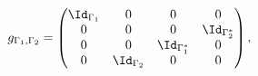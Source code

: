 \begin{equation}
\label{eq:gTdual}
  g_{\Gamma_1,\Gamma_2} =
       \begin{pmatrix}
          \Id_{\Gamma_1} &  0  &  0  &  0 \\
           0  &  0  &  0  & \Id_{\Gamma^*_2}\\     
           0  &  0  & \Id_{\Gamma^*_1} &  0 \\
           0  & \Id_{\Gamma_2} &  0  &  0
       \end{pmatrix},
\end{equation}

